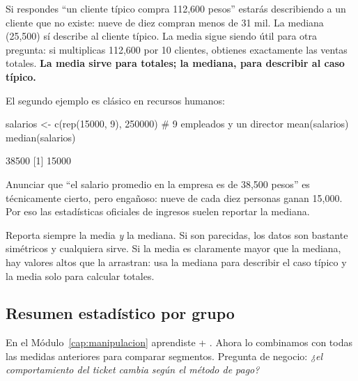 Si respondes ``un cliente típico compra 112,600 pesos'' estarás describiendo
a un cliente que no existe: nueve de diez compran menos de 31 mil. La mediana
(25,500) sí describe al cliente típico. La media sigue siendo útil para otra
pregunta: si multiplicas 112,600 por 10 clientes, obtienes exactamente las
ventas totales. \textbf{La media sirve para totales; la mediana, para
describir al caso típico.}

El segundo ejemplo es clásico en recursos humanos:

\begin{rcode}
salarios <- c(rep(15000, 9), 250000)   # 9 empleados y un director
mean(salarios)
median(salarios)
\end{rcode}
\begin{rsalida}
[1] 38500
[1] 15000
\end{rsalida}

Anunciar que ``el salario promedio en la empresa es de 38,500 pesos'' es
técnicamente cierto, pero engañoso: nueve de cada diez personas ganan 15,000.
Por eso las estadísticas oficiales de ingresos suelen reportar la mediana.

\begin{consejo}
Reporta siempre la media \emph{y} la mediana. Si son parecidas, los datos son
bastante simétricos y cualquiera sirve. Si la media es claramente mayor que la
mediana, hay valores altos que la arrastran: usa la mediana para describir el
caso típico y la media solo para calcular totales.
\end{consejo}

\subsection{Resumen estadístico por grupo}

En el Módulo~\ref{cap:manipulacion} aprendiste  +
. Ahora lo combinamos con todas las medidas anteriores
para comparar segmentos. Pregunta de negocio: \emph{¿el comportamiento del
ticket cambia según el método de pago?}

